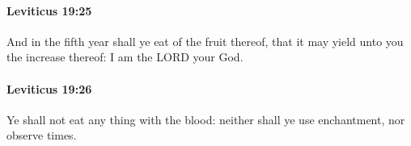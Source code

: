 		\paragraph{Leviticus 19:25} %
			\label{LEVITICUS-19-25}

			And in the fifth year shall ye eat of the fruit thereof, that it may yield unto you the increase thereof: I am the LORD your God.


		\paragraph{Leviticus 19:26} %
			\label{LEVITICUS-19-26}

			Ye shall not eat any thing with the blood: neither shall ye use enchantment, nor observe times.


